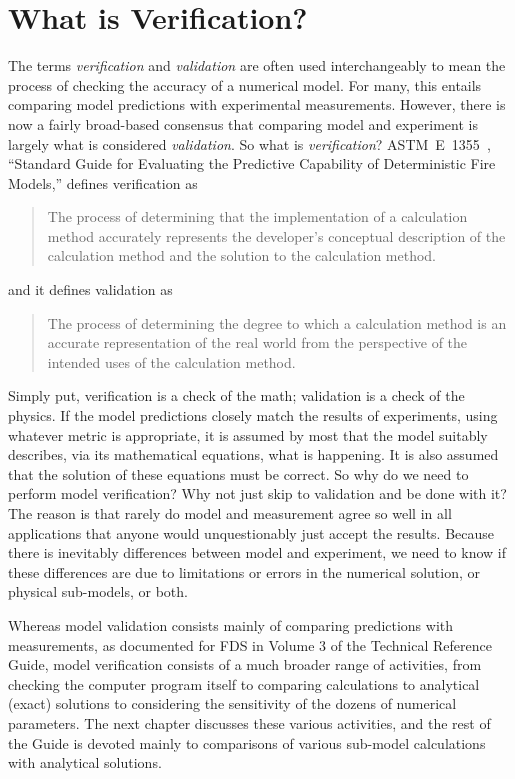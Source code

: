 \documentclass[11pt]{book}
\begin{document}
\cleardoublepage
{}
{}
\listoftables

\mainmatter


\chapter{What is Verification?}

The terms {\em verification} and {\em validation} are often used interchangeably to mean the process of checking the
accuracy of a numerical model. For many, this entails comparing model predictions with experimental measurements. However,
there is now a fairly broad-based consensus that comparing model and experiment is largely what is considered {\em validation}. So what is
{\em verification}? ASTM~E~1355~\cite{ASTM:E1355}, ``Standard Guide for
Evaluating the Predictive Capability of Deterministic Fire Models,'' defines verification as
\begin{quote}
The process of determining that the implementation of a calculation method accurately
represents the developer's conceptual description of the calculation method and the solution to the calculation method.
\end{quote}
and it defines validation as
\begin{quote}
The process of determining the degree to which a calculation method is an accurate representation of the real world
from the perspective of the intended uses of the calculation method.
\end{quote}
Simply put, verification is a check of the math; validation is a check of the physics. If the model predictions closely match
the results of experiments, using whatever metric is appropriate, it is assumed by most that the model suitably describes, via
its mathematical equations, what is happening. It is also assumed that the solution of these equations must be correct. So why do
we need to perform model verification? Why not just skip to validation and be done with it? The reason is that rarely do model and
measurement agree so well in all applications that anyone would unquestionably just accept the results. Because there is
inevitably differences between model and experiment, we need to know if these differences are due to limitations or errors in
the numerical solution, or physical sub-models, or both.

Whereas model validation consists mainly of comparing predictions with measurements, as documented for FDS in Volume 3 of the
Technical Reference Guide, model verification consists of a much broader range of activities, from checking the computer program
itself to comparing calculations to analytical (exact) solutions to considering the sensitivity of the dozens of numerical
parameters. The next chapter discusses these various activities, and the rest of the Guide is devoted mainly to comparisons of
various sub-model calculations with analytical solutions.
\end{document}
